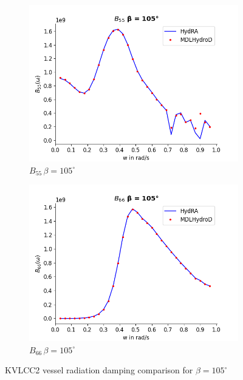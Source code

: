\begin{figure}[H]
\begin{subfigure}[b]{0.49\textwidth}
        \includegraphics[width=\textwidth]{plots/kvlcc/radiation_damp/b55.png}
        \caption{$B_{55} \, \beta = 105^{\circ}$}
    \end{subfigure}
    \begin{subfigure}[b]{0.49\textwidth}
        \includegraphics[width=\textwidth]{plots/kvlcc/radiation_damp/b66.png}
        \caption{$B_{66} \, \beta = 105^{\circ}$}
    \end{subfigure}
    \caption{KVLCC2 vessel radiation damping comparison for $\beta= 105^{\circ}$}
    \label{fig:kvlcc_radition_damp_105}
\end{figure}

